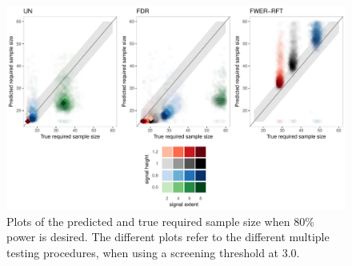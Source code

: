 \begin{center}
\begin{figure}[h]
\includegraphics[scale=0.35]{figures/FIG_SIM_sscalc_15_NOMASK_3_0.pdf}
\caption{Plots of the predicted and true required sample size when 80\% power is desired. The different plots refer to the different multiple testing procedures, when using a screening threshold at 3.0.}
\end{figure}
\end{center}

\clearpage
